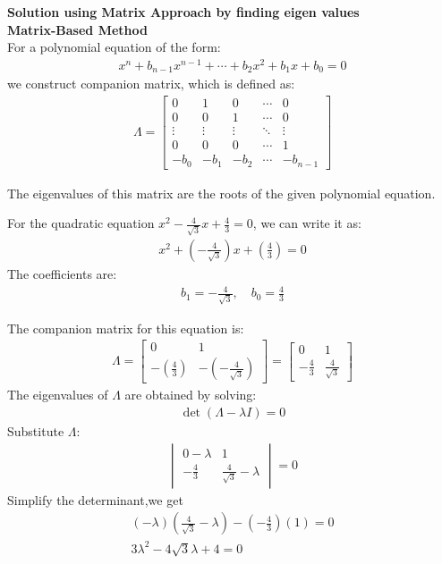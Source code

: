 \documentclass[journal]{IEEEtran}
\begin{document}
\textbf{ Solution using Matrix Approach by finding eigen values}\\
\textbf{Matrix-Based Method}\\
For a polynomial equation of the form:
\begin{align}
    x^n + b_{n-1}x^{n-1} + \cdots + b_2x^2 + b_1x + b_0 = 0
\end{align}
we construct companion matrix, which is defined as:
\begin{align}
    \Lambda =
    \begin{bmatrix}
        0 & 1 & 0 & \cdots & 0 \\
        0 & 0 & 1 & \cdots & 0 \\
        \vdots & \vdots & \vdots & \ddots & \vdots \\
        0 & 0 & 0 & \cdots & 1 \\
        -b_0 & -b_1 & -b_2 & \cdots & -b_{n-1}
    \end{bmatrix}
\end{align}

The eigenvalues of this matrix are the roots of the given polynomial equation.

For the quadratic equation \( x^2 - \frac{4}{\sqrt{3}}x + \frac{4}{3} = 0 \), we can write it as:
\begin{align}
    x^2 + (-\frac{4}{\sqrt{3}})x + (\frac{4}{3}) = 0
\end{align}
The coefficients are:
\begin{align*}
    b_1 = -\frac{4}{\sqrt{3}}, \quad b_0 = \frac{4}{3}
\end{align*}

The companion matrix for this equation is:
\begin{align}
    \Lambda =
    \begin{bmatrix}
        0 & 1 \\
        -(\frac{4}{3}) & -(-\frac{4}{\sqrt{3}})
    \end{bmatrix}
    =
    \begin{bmatrix}
        0 & 1 \\
        -\frac{4}{3} & \frac{4}{\sqrt{3}} 
    \end{bmatrix}
\end{align}
The eigenvalues of \( \Lambda \) are obtained by solving:
\begin{align}
    \det(\Lambda - \lambda I) = 0
\end{align}
Substitute \( \Lambda \):
\begin{align}
    \begin{vmatrix}
        0 - \lambda & 1 \\
        -\frac{4}{3} & \frac{4}{\sqrt{3}} - \lambda
    \end{vmatrix}
    = 0
\end{align}
Simplify the determinant,we get
\begin{align}
    (-\lambda)(\frac{4}{\sqrt{3}} - \lambda) - (-\frac{4}{3})(1) = 0 \\
    3\lambda^2 - {4}{\sqrt{3}}\lambda +4 = 0
\end{align}
\end{document}
